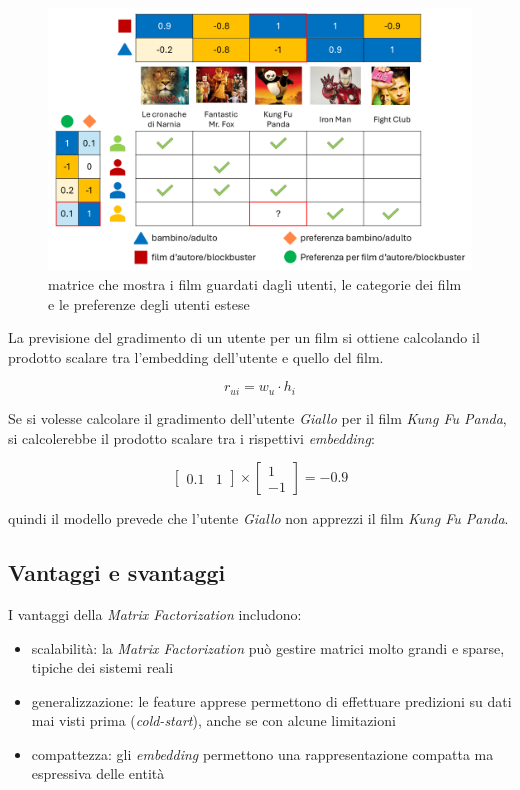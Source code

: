 \begin{figure}[htbp]
    \centering
    \includegraphics[scale=0.4]{figures/collaborative_filtering/2D_matrix.PNG}
    \caption{matrice che mostra i film guardati dagli utenti, le categorie dei film e le preferenze degli utenti estese}
    \label{fig:2D_matrix}
\end{figure}


La previsione del gradimento di un utente per un film si ottiene calcolando il prodotto scalare tra l'embedding dell'utente e quello del film.

\[
r_{ui} = w_u \cdot h_i
\]

Se si volesse calcolare il gradimento dell'utente \textit{Giallo} per il film \textit{Kung Fu Panda}, si calcolerebbe il prodotto scalare tra i rispettivi \textit{embedding}:

\[
\begin{bmatrix}
0.1 & 1
\end{bmatrix}
\times
\begin{bmatrix}
1 \\
-1
\end{bmatrix} = -0.9
\]

quindi il modello prevede che l'utente \textit{Giallo} non apprezzi il film \textit{Kung Fu Panda}.

\subsection{Vantaggi e svantaggi}
I vantaggi della \textit{Matrix Factorization} includono:
\begin{itemize}
    \item scalabilità: la \textit{Matrix Factorization} può gestire matrici molto grandi e sparse, tipiche dei sistemi reali
    \item generalizzazione: le feature apprese permettono di effettuare predizioni su dati mai visti prima (\textit{cold-start}), anche se con alcune limitazioni
    \item compattezza: gli \textit{embedding} permettono una rappresentazione compatta ma espressiva delle entità
\end{itemize}

